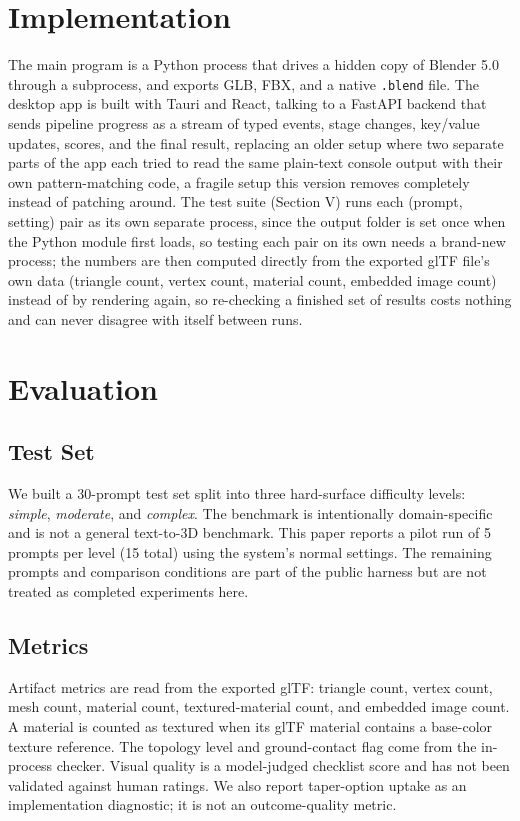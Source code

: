 \documentclass[conference]{IEEEtran}
\begin{document}
\section{Implementation}
The main program is a Python process that drives a hidden copy of Blender 5.0 through a subprocess, and exports GLB, FBX, and a native \texttt{.blend} file. The desktop app is built with Tauri and React, talking to a FastAPI backend that sends pipeline progress as a stream of typed events, stage changes, key/value updates, scores, and the final result, replacing an older setup where two separate parts of the app each tried to read the same plain-text console output with their own pattern-matching code, a fragile setup this version removes completely instead of patching around. The test suite (Section V) runs each (prompt, setting) pair as its own separate process, since the output folder is set once when the Python module first loads, so testing each pair on its own needs a brand-new process; the numbers are then computed directly from the exported glTF file's own data (triangle count, vertex count, material count, embedded image count) instead of by rendering again, so re-checking a finished set of results costs nothing and can never disagree with itself between runs.

\section{Evaluation}
\label{sec:eval}

\subsection{Test Set}
We built a 30-prompt test set split into three hard-surface difficulty levels: \emph{simple}, \emph{moderate}, and \emph{complex}. The benchmark is intentionally domain-specific and is not a general text-to-3D benchmark. This paper reports a pilot run of 5 prompts per level (15 total) using the system's normal settings. The remaining prompts and comparison conditions are part of the public harness but are not treated as completed experiments here.

\subsection{Metrics}
Artifact metrics are read from the exported glTF: triangle count, vertex count, mesh count, material count, textured-material count, and embedded image count. A material is counted as textured when its glTF material contains a base-color texture reference. The topology level and ground-contact flag come from the in-process checker. Visual quality is a model-judged checklist score and has not been validated against human ratings. We also report taper-option uptake as an implementation diagnostic; it is not an outcome-quality metric.
\end{document}
